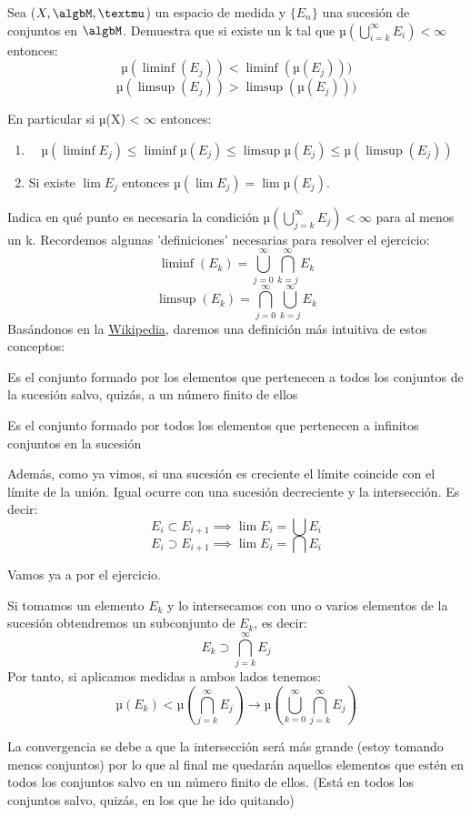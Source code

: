 \begin{problem}[6]
Sea ($X, \algbM, µ$) un espacio de medida y $\{E_n\} $ una sucesión de conjuntos en $\algbM$. Demuestra que si existe un k tal que $µ(\bigcup_{i=k}^{\infty}E_i) < \infty$ entonces:
\[µ(\liminf (E_j))<\liminf (µ(E_j)))\]
\[µ(\limsup (E_j))>\limsup (µ(E_j)))\]

En particular si µ(X) < $\infty$ entonces:
\begin{enumerate}
\item
\[µ(\liminf E_j) \leq \liminf µ(E_j) \leq \limsup µ(E_j) \leq µ(\limsup(E_j))\]
\item Si existe $\lim E_j$ entonces $µ(\lim E_j)=\lim µ(E_j)$.
\end{enumerate}
Indica en qué punto es necesaria la condición $µ(\bigcup_{j=k}^{\infty}E_j)< \infty$ para al menos un k.
\solution
Recordemos algunas 'definiciones' necesarias para resolver el ejercicio:
\[\liminf (E_k) = \bigcup_{j=0}^{\infty} \bigcap_{k=j}^{\infty} E_k\]
\[\limsup (E_k)= \bigcap_{j=0}^{\infty} \bigcup_{k=j}^{\infty} E_k\]
Basándonos en la \href{http://www.xnxx.com/}{Wikipedia}, daremos una definición más intuitiva de estos conceptos:

\begin{defn}
Es el conjunto formado por los elementos que pertenecen a todos los conjuntos de la sucesión salvo, quizás, a un número finito de ellos
\end{defn}

\begin{defn}
Es el conjunto formado por todos los elementos que pertenecen a infinitos conjuntos en la sucesión
\end{defn}

Además, como ya vimos, si una sucesión es creciente el límite coincide con el límite de la unión. Igual ocurre con una sucesión decreciente y la intersección. Es decir:
\[E_i \subset E_{i+1} \implies \lim E_i = \bigcup E_i\]
\[E_i \supset E_{i+1} \implies \lim E_i = \bigcap E_i\]


Vamos ya a por el ejercicio.

Si tomamos un elemento $E_k$ y lo intersecamos con uno o varios elementos de la sucesión obtendremos un subconjunto de $E_k$, es decir:
\[E_k \supset \bigcap_{j=k}^{\infty}E_j\]
Por tanto, si aplicamos medidas a ambos lados tenemos:
\[µ(E_k) < µ(\bigcap_{j=k}^{\infty}E_j) \rightarrow µ(\bigcup_{k=0}^{\infty}\bigcap_{j=k}^{\infty}E_j)\]

La convergencia se debe a que la intersección será más grande (estoy tomando menos conjuntos) por lo que al final me quedarán aquellos elementos que estén en todos los conjuntos salvo en un número finito de ellos. (Está en todos los conjuntos salvo, quizás, en los que he ido quitando)


\end{problem}
